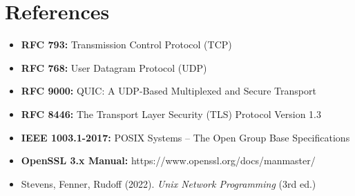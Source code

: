 \documentclass[12pt,a4paper]{article}
\begin{document}
\section{References}
\label{app:refs}

\begin{itemize}
  \item \textbf{RFC 793:} Transmission Control Protocol (TCP)
  \item \textbf{RFC 768:} User Datagram Protocol (UDP)
  \item \textbf{RFC 9000:} QUIC: A UDP-Based Multiplexed and Secure Transport
  \item \textbf{RFC 8446:} The Transport Layer Security (TLS) Protocol Version 1.3
  \item \textbf{IEEE 1003.1-2017:} POSIX Systems – The Open Group Base Specifications
  \item \textbf{OpenSSL 3.x Manual:} https://www.openssl.org/docs/manmaster/
  \item Stevens, Fenner, Rudoff (2022). \textit{Unix Network Programming} (3rd ed.)
\end{itemize}
\end{document}
